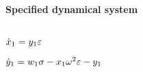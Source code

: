
\(\)
\paragraph{Specified dynamical system}
\(
\)\par

\(\dot x_{1}=y_{1} \varepsilon
\)\par

\(\dot y_{1}=w_{1} \sigma -x_{1} \omega ^{2} \varepsilon-y_{1}
\)\par
